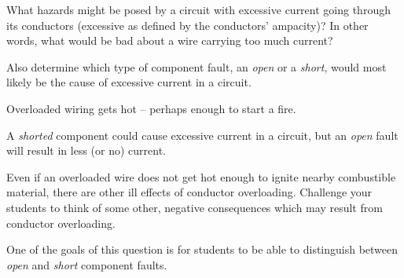 

What hazards might be posed by a circuit with excessive current going through its conductors (excessive as defined by the conductors' ampacity)?  In other words, what would be bad about a wire carrying too much current?

Also determine which type of component fault, an {\it open} or a {\it short}, would most likely be the cause of excessive current in a circuit.








Overloaded wiring gets hot -- perhaps enough to start a fire.

A {\it shorted} component could cause excessive current in a circuit, but an {\it open} fault will result in less (or no) current.







Even if an overloaded wire does not get hot enough to ignite nearby combustible material, there are other ill effects of conductor overloading.  Challenge your students to think of some other, negative consequences which may result from conductor overloading.

One of the goals of this question is for students to be able to distinguish between {\it open} and {\it short} component faults.




